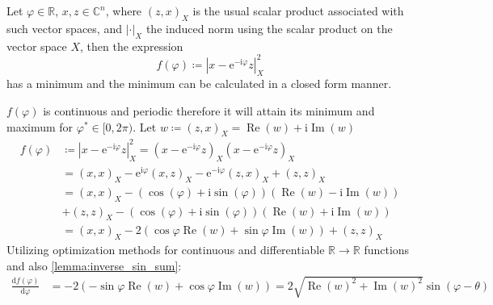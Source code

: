 	\begin{Prop}\label{theorem:min distance}
		Let $\varphi \in \mathbb{R}$, $x,z \in \mathbb{C}^n$, where $(z,x)_X$ is 
		the usual scalar product associated with such vector spaces, and $\left|\cdot\right|_X$ the induced norm using the scalar product on the vector space $X$, then the expression
		\begin{equation}\label{eq:loss_function}
			f(\varphi) \coloneqq \left|x-\mathrm{e}^{-\mathrm{i}\varphi}z\right|^2_X
		\end{equation}
		has a minimum and the minimum can be calculated in a closed form manner.
		\end{Prop}
		\begin{Proof}
			$f(\varphi)$ is continuous and periodic therefore it will attain its minimum and maximum for $\varphi^\ast \in [0,2\pi)$\cite{Rudin1976}. 
			Let $w \coloneqq (z,x)_X = \operatorname{Re}(w)+\mathrm{i}\operatorname{Im}(w)$
			\begin{equation}
				\begin{split}
				f(\varphi) &\coloneqq \left|x-\mathrm{e}^{-\mathrm{i}\varphi}z\right|^2_X = 
				\left(x-\mathrm{e}^{-\mathrm{i}\varphi}z\right)_X\left(x-\mathrm{e}^{-\mathrm{i}\varphi}z\right)_X\\
						   &= \left(x,x\right)_X - \mathrm{e}^{\mathrm{i}\varphi}\left(x,z\right)_X-\mathrm{e}^{-\mathrm{i}\varphi}\left(z,x\right)_X+\left(z,z\right)_X \\
                		   &= \left(x,x\right)_X - (\cos(\varphi)+\mathrm{i}\sin(\varphi))\left(\operatorname{Re}(w) -\mathrm{i}\operatorname{Im}(w)\right)\\
						   &+ \left(z,z\right)_X - (\cos(\varphi)+\mathrm{i}\sin(\varphi))\left(\operatorname{Re}(w) +\mathrm{i}\operatorname{Im}(w)\right)\\
						   &= \left(x,x\right)_X - 2\left(\cos\varphi\operatorname{Re}(w)+\sin\varphi\operatorname{Im}(w)\right)+ \left(z,z\right)_X
				\end{split}
			  \end{equation}
			  Utilizing optimization methods for continuous and differentiable $\mathbb{R} \rightarrow \mathbb{R}$ functions \cite{Boyd2004}\cite{Nocedal2006} and also \cref{lemma:inverse_sin_sum}:
			  \begin{equation}
				\begin{split}
				\frac{\mathrm{d}f(\varphi)}{\mathrm{d}\varphi} &= - 2\left(-\sin\varphi\operatorname{Re}(w)+\cos\varphi\operatorname{Im}(w)\right) = 2\sqrt{\operatorname{Re}(w)^2+\operatorname{Im}(w)^2}\sin(\varphi-\theta)\\ 

\end{split}
\end{equation}
\end{Proof}
